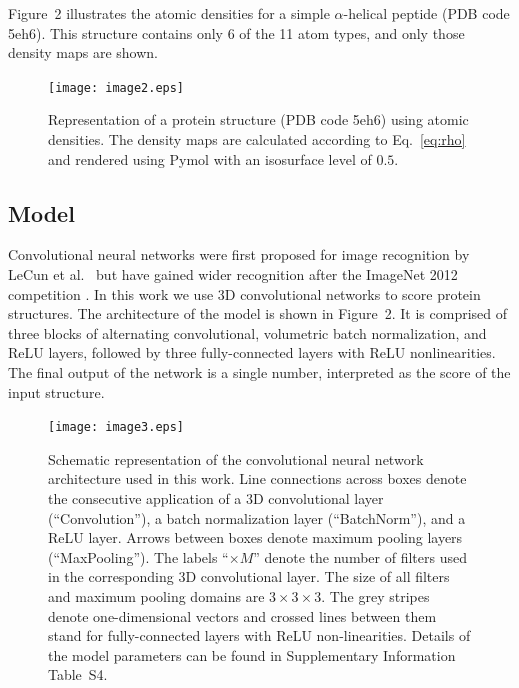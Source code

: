 \documentclass{bioinfo}
\begin{document}
Figure~2\vphantom{\ref{Fig:atomic_densities}} illustrates the atomic densities for
a simple $\alpha$-helical peptide (PDB code 5eh6). This structure
contains only 6 of the 11 atom types, and only those density maps are
shown.

\begin{figure}[!tpb]
    \centering
    \texttt{[image: image2.eps]}

    \caption{Representation of a protein structure (PDB code 5eh6)
    using atomic densities. The density maps are calculated according
    to Eq.~\ref{eq:rho} and rendered using Pymol \citep{PyMOL} with an
    isosurface level of $0.5$.}

    \label{Fig:atomic_densities}
\end{figure}


\subsection{Model}
Convolutional neural networks were first proposed for image
recognition by LeCun et al.\ \citep{lecun1989backpropagation} but have
gained wider recognition after the ImageNet 2012
competition \citep{krizhevsky2012imagenet}. In this work we use 3D
convolutional networks to score protein structures. The architecture
of the model is shown in Figure~2\vphantom{\ref{Fig:CNNModel}}.  It is comprised of
three blocks of alternating convolutional, volumetric batch
normalization, and ReLU layers, followed by three fully-connected
layers with ReLU nonlinearities. The final output of the network is a
single number, interpreted as the score of the input structure.

\begin{figure}[!tpb]
    \centering
    \texttt{[image: image3.eps]}

    \caption{Schematic representation of the convolutional neural
    network architecture used in this work. Line connections across
    boxes denote the consecutive application of a 3D convolutional
    layer (``Convolution''), a batch normalization layer
    (``BatchNorm''), and a ReLU layer. Arrows between boxes denote
    maximum pooling layers (``MaxPooling''). The labels ``$\times M$''
    denote the number of filters used in the corresponding 3D
    convolutional layer. The size of all filters and maximum pooling
    domains are $3\times 3\times 3$. The grey stripes denote
    one-dimensional vectors and crossed lines between them stand for
    fully-connected layers with ReLU non-linearities. Details of the
    model parameters can be found in Supplementary Information Table~S4.}

    \label{Fig:CNNModel}
\end{figure}
\end{document}
